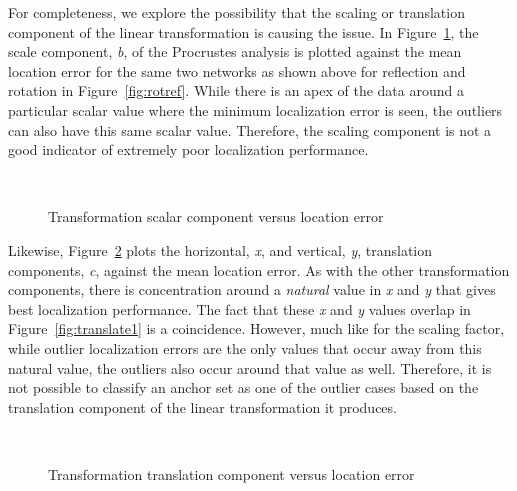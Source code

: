 For completeness, we explore the possibility that the scaling or translation component of the linear transformation is causing the issue.  In Figure~\ref{fig:scalar}, the scale component, \emph{b}, of the Procrustes analysis is plotted against the mean location error for the same two networks as shown above for reflection and rotation in Figure~\ref{fig:rotref}.  While there is an apex of the data around a particular scalar value where the minimum localization error is seen, the outliers can also have this same scalar value.  Therefore, the scaling component is not a good indicator of  extremely poor localization performance.

\begin{figure}
  \centering
\\
	\caption{Transformation scalar component versus location error}	
	\label{fig:scalar}
\end{figure}

Likewise, Figure~\ref{fig:translate} plots the horizontal, \emph{x}, and vertical, \emph{y}, translation components, \emph{c}, against the mean location error. As with the other transformation components, there is concentration around a \emph{natural} value in \emph{x} and \emph{y} that gives best localization performance.  The fact that these \emph{x} and \emph{y} values overlap in Figure~\ref{fig:translate1} is a coincidence. However, much like for the scaling factor, while outlier localization errors are the only values that occur away from this natural value, the outliers also occur around that value as well.  Therefore, it is not possible to classify an anchor set as one of the outlier cases based on the translation component of the linear transformation it produces.

\begin{figure}
  \centering
\\
	\caption{Transformation translation component versus location error}	
	\label{fig:translate}
\end{figure}

